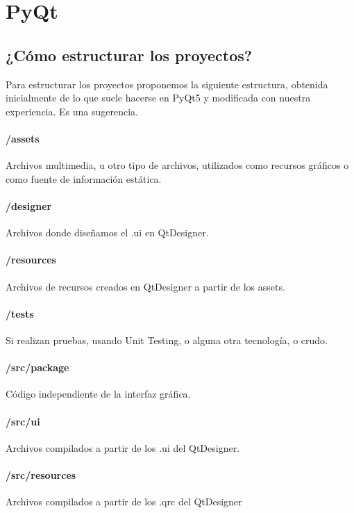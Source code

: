 \section{PyQt}

\subsection{¿C\'omo estructurar los proyectos?}
\label{estructura_programas}
Para estructurar los proyectos proponemos la siguiente estructura, obtenida inicialmente de lo que suele hacerse en PyQt5 y modificada 
con nuestra experiencia. Es una sugerencia.

\paragraph{/assets} Archivos multimedia, u otro tipo de archivos, utilizados como recursos gr\'aficos o como fuente de informaci\'on est\'atica.

\paragraph{/designer} Archivos donde diseñamos el .ui en QtDesigner.

\paragraph{/resources} Archivos de recursos creados en QtDesigner a partir de los assets.

\paragraph{/tests} Si realizan pruebas, usando Unit Testing, o alguna otra tecnolog\'ia, o crudo.

\paragraph{/src/package} Código independiente de la interfaz gr\'afica.

\paragraph{/src/ui} Archivos compilados a partir de los .ui del QtDesigner.

\paragraph{/src/resources} Archivos compilados a partir de los .qrc del QtDesigner

